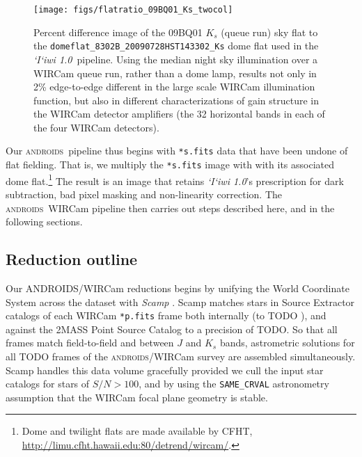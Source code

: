 \documentclass[iop]{emulateapj}
\newcommand{\sw}[1]{\textit{#1}} %
\newcommand{\iiwione}{\sw{`I`iwi 1.0}}
\newcommand{\androids}{\textsc{androids}}
\newcommand{\todo}[1]{\textcolor{RedOrange}{#1}} %
\begin{document}
\begin{figure}[t]
   \centering
    \texttt{[image: figs/flatratio\_09BQ01\_Ks\_twocol]}
    \caption{Percent difference image of the 09BQ01 $K_s$ (queue run) sky flat to the \texttt{domeflat\_8302B\_20090728HST143302\_Ks} dome flat used in the \iiwione\ pipeline. Using the median night sky illumination over a WIRCam queue run, rather than a dome lamp, results not only in 2\% edge-to-edge different in the large scale WIRCam illumination function, but also in different characterizations of gain structure in the WIRCam detector amplifiers (the 32 horizontal bands in each of the four WIRCam detectors).}
   \label{fig:domeflatratio}
\end{figure}

\vspace{1em}

Our \androids\ pipeline thus begins with \texttt{*s.fits} data that have been undone of flat fielding.
That is, we multiply the \texttt{*s.fits} image with with its associated dome flat.\footnote{Dome and twilight flats are made available by CFHT, \url{http://limu.cfht.hawaii.edu:80/detrend/wircam/}.}
The result is an image that retains \iiwione's prescription for dark subtraction, bad pixel masking and non-linearity correction.
The \androids\ WIRCam pipeline then carries out steps described here, and in the following sections.

\subsection{Reduction outline}
\label{sec:reduction_outline}

Our ANDROIDS/WIRCam reductions begins by unifying the World Coordinate System across the dataset with \sw{Scamp} \citep{Bertin:2006}.
Scamp matches stars in Source Extractor \citep{Bertin:1996} catalogs of each WIRCam \texttt{*p.fits} frame both internally (to \todo{TODO} \arcsec ), and against the 2MASS Point Source Catalog \citep{Skrutskie:2006} to a precision of \todo{TODO}\arcsec.
So that all frames match field-to-field and between $J$ and $K_s$ bands, astrometric solutions for all \todo{TODO} frames of the \androids /WIRCam survey are assembled simultaneously.  Scamp handles this data volume gracefully provided we cull the input star catalogs for stars of $S/N > 100$, and by using the \texttt{SAME\_CRVAL} astronometry assumption that the WIRCam focal plane geometry is stable.
\end{document}
